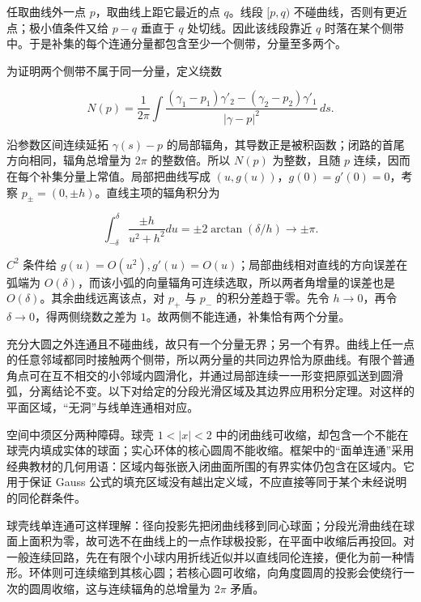 \documentclass[11pt,a4paper]{article}
\begin{document}
任取曲线外一点 \(p\)，取曲线上距它最近的点 \(q\)。线段 \([p,q)\)
不碰曲线，否则有更近点；极小值条件又给 \(p-q\) 垂直于 \(q\)
处切线。因此该线段靠近 \(q\)
时落在某个侧带中。于是补集的每个连通分量都包含至少一个侧带，分量至多两个。

为证明两个侧带不属于同一分量，定义绕数

\begin{equation*}
 N(p)=\frac1{2\pi}\int\frac{(\gamma_1-p_1)\gamma'_2-(\gamma_2-p_2)\gamma'_1}{|\gamma-p|^2}\,ds.
\end{equation*}

沿参数区间连续延拓 \(\gamma(s)-p\)
的局部辐角，其导数正是被积函数；闭路的首尾方向相同，辐角总增量为
\(2\pi\) 的整数倍。所以 \(N(p)\) 为整数，且随 \(p\)
连续，因而在每个补集分量上常值。局部把曲线写成
\((u,g(u))\)，\(g(0)=g'(0)=0\)，考察
\(p_\pm=(0,\pm h)\)。直线主项的辐角积分为

\begin{equation*}
 \int_{-\delta}^{\delta}\frac{\pm h}{u^2+h^2}du
 =\pm2\arctan(\delta/h)\longrightarrow\pm\pi.
\end{equation*}

\(C^2\) 条件给
\(g(u)=O(u^2),g'(u)=O(u)\)；局部曲线相对直线的方向误差在弧端为
\(O(\delta)\)，而该小弧的向量辐角可连续选取，所以两者角增量的误差也是
\(O(\delta)\)。其余曲线远离该点，对 \(p_+\) 与 \(p_-\)
的积分差趋于零。先令 \(h\to0\)，再令 \(\delta\to0\)，得两侧绕数之差为
\(1\)。故两侧不能连通，补集恰有两个分量。

充分大圆之外连通且不碰曲线，故只有一个分量无界；另一个有界。曲线上任一点的任意邻域都同时接触两个侧带，所以两分量的共同边界恰为原曲线。有限个普通角点可在互不相交的小邻域内圆滑化，并通过局部连续一一形变把原弧送到圆滑弧，分离结论不变。以下对给定的分段光滑区域及其边界应用积分定理。对这样的平面区域，``无洞''与线单连通相对应。

空间中须区分两种障碍。球壳 \(1<|x|<2\)
中的闭曲线可收缩，却包含一个不能在球壳内填成实体的球面；实心环体的核心圆周不能收缩。框架中的``面单连通''采用经典教材的几何用语：区域内每张嵌入闭曲面所围的有界实体仍包含在区域内。它用于保证
Gauss
公式的填充区域没有越出定义域，不应直接等同于某个未经说明的同伦群条件。

球壳线单连通可这样理解：径向投影先把闭曲线移到同心球面；分段光滑曲线在球面上面积为零，故可选不在曲线上的一点作球极投影，在平面中收缩后再投回。对一般连续回路，先在有限个小球内用折线近似并以直线同伦连接，便化为前一种情形。环体则可连续缩到其核心圆；若核心圆可收缩，向角度圆周的投影会使绕行一次的圆周收缩，这与连续辐角的总增量为
\(2\pi\) 矛盾。
\end{document}
